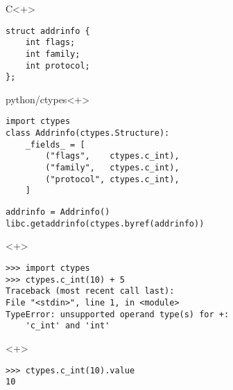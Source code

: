\documentclass[pdf]{beamer}
\begin{document}
\begin{frame}[fragile]
    \begin{block}{C}<+>
        \begin{lstlisting}
struct addrinfo {
    int flags;
    int family;
    int protocol;
};
        \end{lstlisting}
    \end{block}

    \begin{block}{python/ctypes}<+>
        \begin{lstlisting}
import ctypes
class Addrinfo(ctypes.Structure):
    _fields_ = [
        ("flags",    ctypes.c_int),
        ("family",   ctypes.c_int),
        ("protocol", ctypes.c_int),
    ]
        \end{lstlisting}
    \end{block}

\end{frame}

\begin{frame}[fragile]
    \begin{lstlisting}
addrinfo = Addrinfo()
libc.getaddrinfo(ctypes.byref(addrinfo))
    \end{lstlisting}

\end{frame}

\begin{frame}[fragile]{}
    \begin{block}{}<+>
        \begin{lstlisting}
>>> import ctypes
>>> ctypes.c_int(10) + 5
Traceback (most recent call last):
File "<stdin>", line 1, in <module>
TypeError: unsupported operand type(s) for +:
    'c_int' and 'int'
        \end{lstlisting}
    \end{block}

    \begin{block}{}<+>
        \begin{lstlisting}
>>> ctypes.c_int(10).value
10
        \end{lstlisting}
    \end{block}

    \note{
    }
\end{frame}
\end{document}
